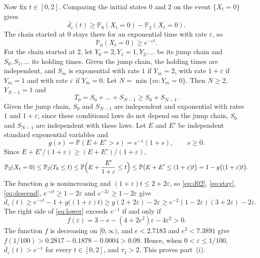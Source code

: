 \documentclass[11pt]{amsart}
\numberwithin{equation}{section}
\newcommand{\Pp}{\mathbb P}
\newcommand{\dbar}{\bar d}
\begin{document}
Now fix $t\in[0,2]$. Comparing the initial states $0$ and $2$ on the event $\{X_t=0\}$ gives
\begin{equation}\label{eq:d02}
\dbar_\varepsilon(t)\ge\Pp_0(X_t=0)-\Pp_2(X_t=0).
\end{equation}
The chain started at $0$ stays there for an exponential time with rate $\varepsilon$, so
\begin{equation}\label{eq:stay}
\Pp_0(X_t=0)\ge e^{-\varepsilon t}.
\end{equation}
For the chain started at $2$, let $Y_0=2,Y_1=1,Y_2,\dots$ be its jump chain and $S_0,S_1,\dots$ its holding times. Given the jump chain, the holding times are independent, and $S_m$ is exponential with rate $1$ if $Y_m=2$, with rate $1+\varepsilon$ if $Y_m=1$ and with rate $\varepsilon$ if $Y_m=0$. Let $N=\min\{m:Y_m=0\}$. Then $N\ge2$, $Y_{N-1}=1$ and
\[
T_0=S_0+\dots+S_{N-1}\ge S_0+S_{N-1}.
\]
Given the jump chain, $S_0$ and $S_{N-1}$ are independent and exponential with rates $1$ and $1+\varepsilon$; since these conditional laws do not depend on the jump chain, $S_0$ and $S_{N-1}$ are independent with these laws. Let $E$ and $E'$ be independent standard exponential variables and
\[
g(s)=\Pp(E+E'>s)=e^{-s}(1+s),\qquad s\ge0.
\]
Since $E+E'/(1+\varepsilon)\ge(E+E')/(1+\varepsilon)$,
\begin{equation}\label{eq:descend}
\Pp_2(X_t=0)\le\Pp_2(T_0\le t)\le\Pp\Bigl(E+\frac{E'}{1+\varepsilon}\le t\Bigr)\le\Pp\bigl(E+E'\le(1+\varepsilon)t\bigr)=1-g\bigl((1+\varepsilon)t\bigr).
\end{equation}
The function $g$ is nonincreasing and $(1+\varepsilon)t\le2+2\varepsilon$, so \eqref{eq:d02}, \eqref{eq:stay}, \eqref{eq:descend}, $e^{-\varepsilon t}\ge1-2\varepsilon$ and $e^{-2\varepsilon}\ge1-2\varepsilon$ give
\begin{equation}\label{eq:lower}
\dbar_\varepsilon(t)\ge e^{-\varepsilon t}-1+g\bigl((1+\varepsilon)t\bigr)\ge g(2+2\varepsilon)-2\varepsilon\ge e^{-2}(1-2\varepsilon)(3+2\varepsilon)-2\varepsilon.
\end{equation}
The right side of \eqref{eq:lower} exceeds $e^{-1}$ if and only if
\[
f(\varepsilon)=3-e-(4+2e^2)\varepsilon-4\varepsilon^2>0.
\]
The function $f$ is decreasing on $[0,\infty)$, and $e<2.7183$ and $e^2<7.3891$ give $f(1/100)>0.2817-0.1878-0.0004>0.09$. Hence, when $0<\varepsilon\le1/100$, $\dbar_\varepsilon(t)>e^{-1}$ for every $t\in[0,2]$, and $\tau_1>2$. This proves part~(i).
\end{document}
